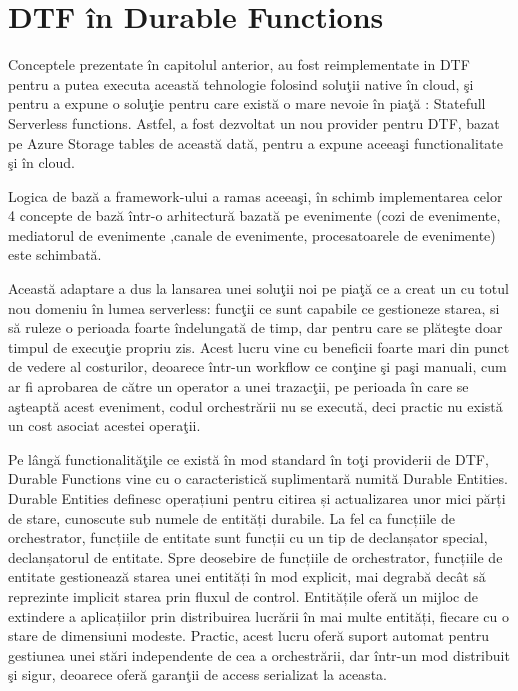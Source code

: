 \section{DTF în Durable Functions} 
\quad Conceptele prezentate în capitolul anterior, au fost reimplementate in DTF pentru a putea executa această tehnologie folosind soluţii native în cloud, şi pentru a expune o soluţie pentru care există o mare nevoie în piaţă : Statefull Serverless functions. Astfel, a fost dezvoltat un nou provider pentru DTF, bazat pe Azure Storage tables de această dată, pentru a expune aceeaşi functionalitate şi în cloud. 
\par Logica de bază a framework-ului a ramas aceeaşi, în schimb implementarea celor 4 concepte de bază într-o arhitectură bazată pe evenimente (cozi de evenimente, mediatorul de evenimente ,canale de evenimente, procesatoarele de evenimente) este schimbată.
\par Această adaptare a dus la lansarea unei soluţii noi pe piaţă ce a creat un cu totul nou domeniu în lumea serverless: funcţii ce sunt capabile ce gestioneze starea, si să ruleze o perioada foarte îndelungată de timp, dar pentru care se plăteşte doar timpul de execuţie propriu zis. Acest lucru vine cu beneficii foarte mari din punct de vedere al costurilor, deoarece într-un workflow ce conţine şi paşi manuali, cum ar fi aprobarea de către un operator a unei trazacţii, pe perioada în care se aşteaptă acest eveniment, codul orchestrării nu se execută, deci practic nu există un cost asociat acestei operaţii. 
\par Pe lângă functionalităţile ce există în mod standard în toţi providerii de DTF, Durable Functions vine cu o caracteristică suplimentară numită Durable Entities. Durable Entities definesc operațiuni pentru citirea și actualizarea unor mici părți de stare, cunoscute sub numele de entități durabile. La fel ca funcțiile de orchestrator, funcțiile de entitate sunt funcții cu un tip de declanșator special, declanșatorul de entitate. Spre deosebire de funcțiile de orchestrator, funcțiile de entitate gestionează starea unei entități în mod explicit, mai degrabă decât să reprezinte implicit starea prin fluxul de control. Entitățile oferă un mijloc de extindere a aplicațiilor prin distribuirea lucrării în mai multe entități, fiecare cu o stare de dimensiuni modeste. Practic, acest lucru oferă suport automat pentru gestiunea unei stări independente de cea a orchestrării, dar într-un mod distribuit şi sigur, deoarece oferă garanţii de access serializat la aceasta. 
